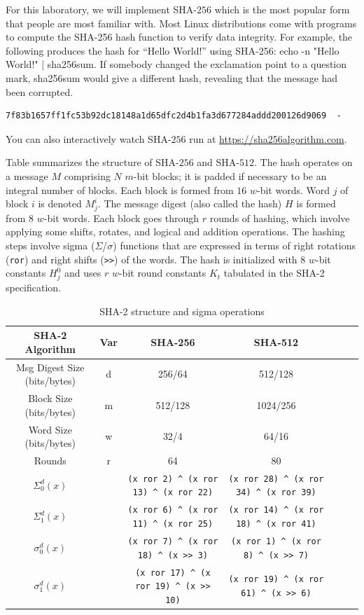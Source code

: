 \documentclass{article}
\begin{document}
For this laboratory, we will implement SHA-$256$ which is the most
popular form that people are most familiar with. Most Linux
distributions come with programs to compute the SHA-256 hash function
to verify data integrity. For example, the following produces the hash
for “Hello World!” using SHA-256: echo -n "Hello World!" |
sha256sum. If somebody changed the exclamation point to a question
mark, sha256sum would give a different hash, revealing that the
message had been corrupted.
\begin{verbatim}
7f83b1657ff1fc53b92dc18148a1d65dfc2d4b1fa3d677284addd200126d9069  -
\end{verbatim}
You can also interactively watch SHA-$256$ run at
\url{https://sha256algorithm.com}.

Table summarizes the structure of SHA-$256$ and SHA-$512$. The hash
operates on a message $M$ comprising $N$ $m$-bit blocks; it is padded if
necessary to be an integral number of blocks. Each block is formed
from $16$ $w$-bit words. Word $j$ of block $i$ is denoted $M_j^{i}$.
The message digest (also called the hash) $H$ is formed from $8$ $w$-bit
words. Each block goes through $r$ rounds of hashing, which involve
applying some shifts, rotates, and logical and addition
operations. The hashing steps involve sigma ($\Sigma$/$\sigma$) functions that are
expressed in terms of right rotations (\verb!ror!) and right shifts (\verb!>>!) of
the words. The hash is initialized with $8$ $w$-bit constants $H_j^{0}$
and uses $r$ $w$-bit round constants $K_t$ tabulated in the SHA-2
specification.
\begin{table}
  \centering
  {\footnotesize
  \begin{tabular}{|c|c|c|c|c|c|c|} \hline
    SHA-2 Algorithm & Var & SHA-256 & SHA-512 \\ \hline \hline
    Msg Digest Size (bits/bytes) & d & 256/64 & 512/128 \\ \hline
    Block Size (bits/bytes) & m & 512/128 & 1024/256 \\ \hline
    Word Size (bits/bytes) & w & 32/4 & 64/16 \\ \hline
    Rounds & r & 64 & 80 \\ \hline
    $\Sigma_0^{d} (x)$ & &
    \verb!(x ror 2) ^ (x ror 13) ^ (x ror 22)! &
    \verb!(x ror 28) ^ (x ror 34) ^ (x ror 39)! \\ \hline
    $\Sigma_1^{d} (x)$ & &
    \verb!(x ror 6) ^ (x ror 11) ^ (x ror 25)! &
    \verb!(x ror 14) ^ (x ror 18) ^ (x ror 41)! \\ \hline
    $\sigma_0^{d} (x)$ & &
    \verb!(x ror 7) ^ (x ror 18) ^ (x >> 3)! &
    \verb!(x ror 1) ^ (x ror 8) ^ (x >> 7)! \\ \hline
    $\sigma_1^{d} (x)$ & &
    \verb!(x ror 17) ^ (x ror 19) ^ (x >> 10)! &
    \verb!(x ror 19) ^ (x ror 61) ^ (x >> 6)! \\ \hline
  \end{tabular}
  }
  \caption{SHA-2 structure and sigma operations}
\end{table}
\end{document}
